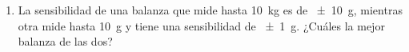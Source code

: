 \documentclass[
]{article}
\providecommand{\tightlist}{%
  \setlength{\itemsep}{0pt}\setlength{\parskip}{0pt}}
\begin{document}
\begin{enumerate}
  \begin{enumerate}
  \def\labelenumii{\alph{enumii})}
  \tightlist
  \item
    \SI{1,55}{\m};
  \item
    \SI{9,02}{\m};
  \item
    \SI{0,010}{\cm};
  \item
    \SI{1,00e3}{\cm};
  \item
    \SI{2500}{\cm};
  \end{enumerate}
\item
  La sensibilidad de una balanza que mide hasta \SI{10}{\kg} es de
  \SI{+-10}{\g}, mientras otra mide hasta \SI{10}{\g} y tiene una
  sensibilidad de \SI{+-1}{\g}. ¿Cuáles la mejor balanza de las dos?
\end{enumerate}
\end{document}
